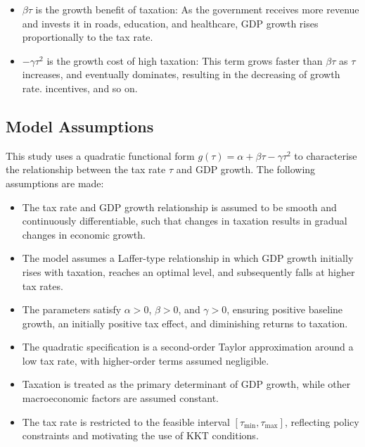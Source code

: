 \documentclass[12pt,a4paper]{report}
\theoremstyle{definition}
\theoremstyle{plain}
\theoremstyle{remark}
\begin{document}
{\begin{itemize}
			\item $\beta\tau$ \; is the growth benefit of taxation: As the
			government receives more revenue and invests it in roads, education,
			and healthcare, GDP growth rises proportionally to the tax rate.
			
			\item $-\gamma\tau^2$ \; is the growth cost of high taxation: This
			term grows faster than $\beta\tau$ as $\tau$ increases, and eventually dominates, resulting in the decreasing of growth rate.
			incentives, and so on.
		\end{itemize}
		
		\subsection{Model Assumptions}
		
		This study uses a quadratic functional form $g(\tau) = \alpha + \beta\tau - \gamma\tau^2$ to characterise the relationship between the tax rate $\tau$ and GDP growth. The following assumptions are made:
		
		\begin{itemize}
			\item The tax rate and GDP growth relationship is assumed to be smooth and continuously differentiable, such that changes in taxation results in gradual changes in economic growth.
			
			\item The model assumes a Laffer-type relationship in which GDP growth initially rises with taxation, reaches an optimal level, and subsequently falls at higher tax rates.
			
			\item The parameters satisfy $\alpha>0$, $\beta>0$, and $\gamma>0$, ensuring positive baseline growth, an initially positive tax effect, and diminishing returns to taxation.
			
			\item The quadratic specification is a second-order Taylor approximation around a low tax rate, with higher-order terms assumed negligible.
			
			\item Taxation is treated as the primary determinant of GDP growth, while other macroeconomic factors are assumed constant.
			
			\item The tax rate is restricted to the feasible interval $[\tau_{\min},\tau_{\max}]$, reflecting policy constraints and motivating the use of KKT conditions.
		\end{itemize}
		
}
\end{document}
